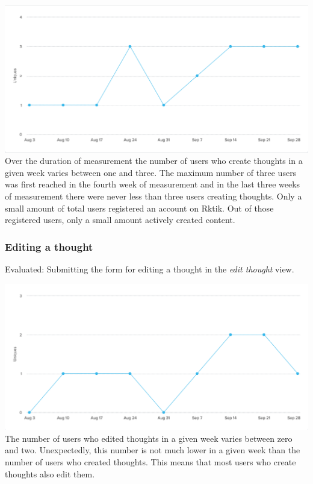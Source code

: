 \includegraphics{img/eval_create_thought.png}\\
 Over the duration of measurement the number of users who create
thoughts in a given week varies between one and three. The maximum
number of three users was first reached in the fourth week of
measurement and in the last three weeks of measurement there were never
less than three users creating thoughts. Only a small amount of total
users registered an account on Rktik. Out of those registered users,
only a small amount actively created content.

\subsubsection{Editing a thought}\label{editing-a-thought}

Evaluated: Submitting the form for editing a thought in the \emph{edit
thought} view.

\includegraphics{img/eval_edit_thought.png}\\
 The number of users who edited thoughts in a given week varies between
zero and two. Unexpectedly, this number is not much lower in a given
week than the number of users who created thoughts. This means that most
users who create thoughts also edit them.

